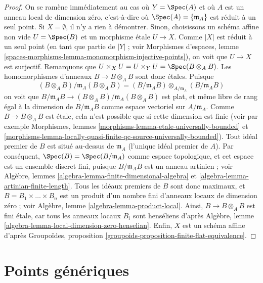 \begin{proof}
On se ramène immédiatement au cas où $Y = \Spec(A)$ et où
$A$ est un anneau local de dimension zéro, c'est-à-dire où
$\Spec(A) = \{\mathfrak m_A\}$
est réduit à un seul point. Si $X = \emptyset$, il n'y a rien à démontrer.
Sinon, choisissons un schéma affine non vide $U = \Spec(B)$ et un morphisme
étale $U \to X$. Comme $|X|$ est réduit à un seul point (en tant que partie de
$|Y|$ ; voir Morphismes d'espaces, lemme
\ref{spaces-morphisms-lemma-monomorphism-injective-points}),
on voit que $U \to X$ est surjectif. Remarquons que
$U \times_X U = U \times_Y U = \Spec(B \otimes_A B)$.
Les homomorphismes d'anneaux $B \to B \otimes_A B$ sont donc étales.
Puisque
$$
(B \otimes_A B)/\mathfrak m_A(B \otimes_A B)
=
(B/\mathfrak m_AB) \otimes_{A/\mathfrak m_A} (B/\mathfrak m_AB)
$$
on voit que
$B/\mathfrak m_AB \to (B \otimes_A B)/\mathfrak m_A(B \otimes_A B)$
est plat, et même libre de rang égal à la dimension de
$B/\mathfrak m_AB$ comme espace vectoriel sur $A/\mathfrak m_A$. Comme
$B \to B \otimes_A B$ est étale, cela n'est possible que si cette dimension
est finie (voir par exemple
Morphismes, lemmes \ref{morphisms-lemma-etale-universally-bounded} et
\ref{morphisms-lemma-locally-quasi-finite-qc-source-universally-bounded}).
Tout idéal premier de $B$ est situé au-dessus de $\mathfrak m_A$ (l'unique
idéal premier de $A$). Par conséquent,
$\Spec(B) = \Spec(B/\mathfrak m_A)$ comme espace topologique, et cet espace
est un ensemble discret fini, puisque $B/\mathfrak m_A B$ est un anneau
artinien ; voir
Algèbre, lemmes \ref{algebra-lemma-finite-dimensional-algebra} et
\ref{algebra-lemma-artinian-finite-length}.
Tous les idéaux premiers de $B$ sont donc maximaux, et
$B = B_1 \times \ldots \times B_n$ est un produit d'un nombre fini d'anneaux
locaux de dimension zéro ; voir
Algèbre, lemme \ref{algebra-lemma-product-local}.
Ainsi, $B \to B \otimes_A B$ est fini étale, car tous les anneaux locaux
$B_i$ sont henséliens d'après
Algèbre, lemme \ref{algebra-lemma-local-dimension-zero-henselian}.
Enfin, $X$ est un schéma affine d'après
Groupoïdes, proposition \ref{groupoids-proposition-finite-flat-equivalence}.
\end{proof}








\section{Points génériques}
\label{section-generic-points}

